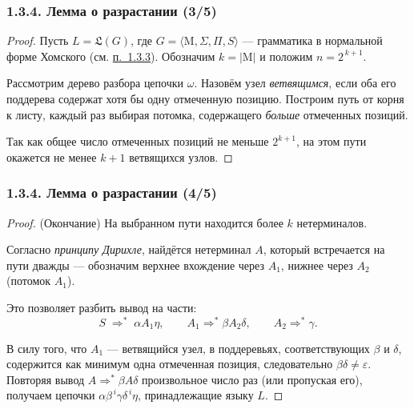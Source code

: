 \documentclass[mathserif,12pt,aspectratio=169]{beamer}
\renewcommand{\index}[1]{}
\def\odmkey#1#2{{\it\color{red} #1}\index{#2}}
\def\DMref#1#2{{\color{blue}\underline{\hyperlink{#2}{#1}}}}
\begin{document}
\begin{frame}
  \frametitle{1.3.4. Лемма о разрастании (3/5)}

  \begin{proof}
    Пусть $L = \mathfrak{L}(G)$, где $G = \langle \mathrm{M},\Sigma,\Pi,S\rangle$ —
    грамматика в нормальной форме Хомского (см. \DMref{п.~1.3.3}{1.3.3.}).
    Обозначим $k = |\mathrm{M}|$ и положим $n = 2^{\,k+1}$.

    Рассмотрим дерево разбора цепочки $\omega$.
    Назовём узел \odmkey{ветвящимся}{Узел!ветвящийся},
    если оба его поддерева содержат хотя бы одну отмеченную позицию.
    Построим путь от корня к листу, каждый раз выбирая потомка,
    содержащего \emph{больше} отмеченных позиций.

    Так как общее число отмеченных позиций не меньше $2^{k+1}$,
    на этом пути окажется не менее $k+1$ ветвящихся узлов.
  \end{proof}

\end{frame}

\begin{frame}
  \frametitle{1.3.4. Лемма о разрастании (4/5)}

  \begin{proof}(Окончание)
    На выбранном пути находится более $k$ нетерминалов.
    
    Согласно \emph{принципу Дирихле}, найдётся нетерминал $A$, который
    встречается на пути дважды — обозначим верхнее вхождение через $A_1$,
    нижнее через $A_2$ (потомок $A_1$).

    Это позволяет разбить вывод на части:
    \[
      S \;\Rightarrow^*\; \alpha A_1 \eta,\qquad
      A_1 \Rightarrow^* \beta A_2 \delta,\qquad
      A_2 \Rightarrow^* \gamma .
    \]

    В силу того, что $A_1$ — ветвящийся узел, в поддеревьях, соответствующих
    $\beta$ и $\delta$, содержится как минимум одна отмеченная позиция,
    следовательно $\beta\delta \neq \varepsilon$.
    Повторяя вывод $A \Rightarrow^* \beta A \delta$ произвольное число раз
    (или пропуская его), получаем цепочки
    $\alpha \beta^{\,i} \gamma \delta^{\,i} \eta$, принадлежащие языку $L$.
  \end{proof}

\end{frame}
\end{document}
